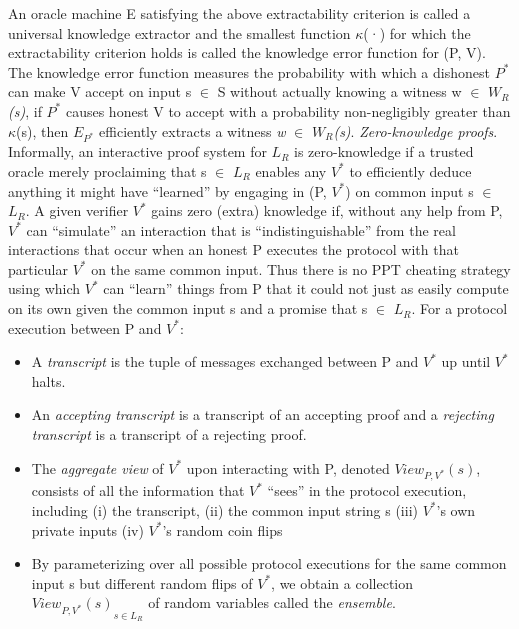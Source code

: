 \documentclass[a4paper]{article}
\newcommand{\quotes}[1]{``#1''}
\begin{document}
An oracle machine E satisfying the above extractability criterion is called a universal knowledge extractor and the smallest function \(\kappa\)(·) for which the extractability criterion holds  is called the knowledge error function for (P, V). The knowledge error function measures the probability with which a dishonest \textit{$P^{*}$} can make V accept on input s $\in$ S without actually knowing a witness w $\in$ \textit{$W_R$(s)}, if \textit{$P^{*}$} causes honest V to accept with a probability non-negligibly greater than \(\kappa\)(s), then $E_{P^{*}}$ efficiently extracts a witness \textit{w} $\in$ \textit{$W_R$(s)}.
\newline
\textit{Zero-knowledge proofs}. Informally, an interactive proof system for \textit{$L_R$} is zero-knowledge if a trusted oracle merely proclaiming that s $\in$ \textit{$L_R$} enables any \textit{$V^{*}$} to efficiently deduce anything it might have \quotes{learned} by engaging in (P, ${V^{*}}$) on common input s $\in$ \textit{$L_R$}. A given verifier ${V^{*}}$ gains zero (extra) knowledge if, without any help from P, ${V^{*}}$ can \quotes{simulate} an interaction that is \quotes{indistinguishable} from the real interactions that occur when an honest P executes the protocol with that particular ${V^{*}}$ on the same common input. Thus there is no PPT cheating strategy using which ${V^{*}}$ can \quotes{learn} things from P that it could not just as easily compute on its own given the common input s and a promise that s $\in$ \textit{$L_R$}.
\newline
For a protocol execution between P and ${V^{*}}$: 
\begin{itemize}
  \item A \emph{transcript} is the tuple of messages exchanged between P and ${V^{*}}$ up until ${V^{*}}$ halts. 
  \item An \emph{accepting transcript} is a transcript of an accepting proof and a \emph{rejecting transcript} is a transcript of a rejecting proof.
  \item The \emph{aggregate view} of ${V^{*}}$ upon interacting with P, denoted $View_{P,V^{*}}(s)$, consists of all the information that ${V^{*}}$ \quotes{sees} in the protocol execution, including (i) the transcript, (ii) the common input string s (iii) ${V^{*}}$’s own private inputs (iv) ${V^{*}}$’s random coin flips  
  \item By parameterizing over all possible protocol executions for the same common input s but different random flips of ${V^{*}}$, we obtain a collection ${ View_{P,V^{*}}(s)}_{s \in L_R }$ of random variables called the \emph{ensemble}.
\end{itemize}
\end{document}
